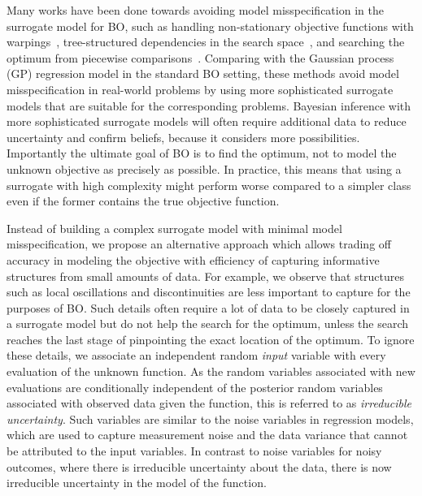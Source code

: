 Many works have been done towards avoiding model misspecification in the surrogate model for BO, such as handling non-stationary objective functions with warpings~\parencite{snoek_input_2014}, tree-structured dependencies in the search space~\parencite{jenatton_bayesian_2017}, and searching the optimum from piecewise comparisons~\parencite{gonzalez_preferential_2017}.
Comparing with the Gaussian process (GP) regression model in the standard BO setting, these methods avoid model misspecification in real-world problems by using more sophisticated surrogate models that are suitable for the corresponding problems.
Bayesian inference with more sophisticated surrogate models will often require additional data to reduce uncertainty and confirm beliefs, because it considers more possibilities.
Importantly the ultimate goal of BO is to find the optimum, not to model the unknown objective as precisely as possible.
In practice, this means that using a surrogate with high complexity might perform worse compared to a simpler class
even if the former contains the true objective function.

Instead of building a complex surrogate model with minimal model misspecification,
we propose an alternative approach which allows trading off accuracy in modeling the objective with efficiency of capturing informative structures from small amounts of data.
For example, we observe that structures such as local oscillations and discontinuities are less important to capture for the purposes of BO.
Such details often require a lot of data to be closely captured in a surrogate model but do not help the search for the optimum,
unless the search reaches the last stage of pinpointing the exact location of the optimum.
To ignore these details, we associate an independent random \emph{input} variable with every evaluation of the unknown function.
As the random variables associated with new evaluations are conditionally independent of the posterior random variables associated with observed data given the function,
this is referred to as \emph{irreducible uncertainty}.
Such variables are similar to the noise variables in regression models, which are used to capture measurement noise and the data variance that cannot be attributed to the input variables.
In contrast to noise variables for noisy outcomes,
where there is irreducible uncertainty about the data, there is now irreducible uncertainty in the model of the function.

